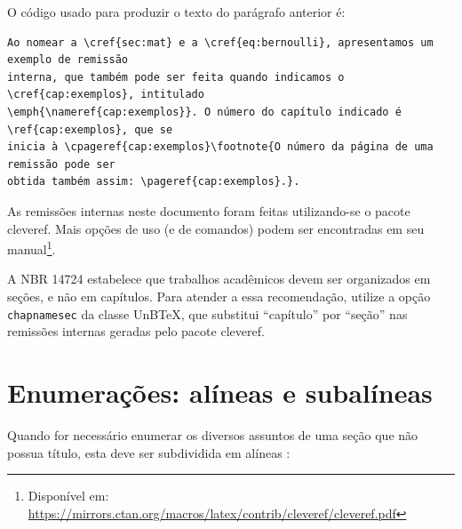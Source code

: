 O código usado para produzir o texto do parágrafo anterior é:
\begin{verbatim}
Ao nomear a \cref{sec:mat} e a \cref{eq:bernoulli}, apresentamos um exemplo de remissão
interna, que também pode ser feita quando indicamos o \cref{cap:exemplos}, intitulado
\emph{\nameref{cap:exemplos}}. O número do capítulo indicado é \ref{cap:exemplos}, que se
inicia à \cpageref{cap:exemplos}\footnote{O número da página de uma remissão pode ser
obtida também assim: \pageref{cap:exemplos}.}.
\end{verbatim}

As remissões internas neste documento foram feitas utilizando-se o pacote \textsf{cleveref}. Mais opções de uso (e de comandos) podem ser encontradas em seu manual\footnote{Disponível em: \url{https://mirrors.ctan.org/macros/latex/contrib/cleveref/cleveref.pdf}}.

A NBR 14724 \cite[p. 8]{NBR14724:2024} estabelece que trabalhos acadêmicos devem ser organizados em seções, e não em capítulos. Para atender a essa recomendação, utilize a opção \texttt{chapnamesec} da classe UnB\TeX, que substitui ``capítulo'' por ``seção'' nas remissões internas geradas pelo pacote \textsf{cleveref}.

\section{Enumerações: alíneas e subalíneas}

Quando for necessário enumerar os diversos assuntos de uma seção que não possua título, esta deve ser subdividida em alíneas \cite[p. 3]{NBR6024:2012}:

